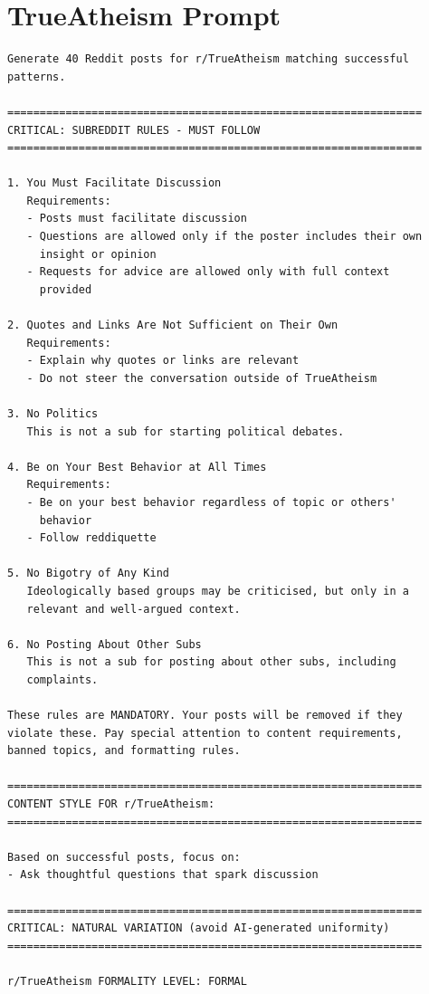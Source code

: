 \section{TrueAtheism Prompt}

\begin{small}
\begin{verbatim}
Generate 40 Reddit posts for r/TrueAtheism matching successful 
patterns.

================================================================
CRITICAL: SUBREDDIT RULES - MUST FOLLOW
================================================================

1. You Must Facilitate Discussion
   Requirements:
   - Posts must facilitate discussion
   - Questions are allowed only if the poster includes their own 
     insight or opinion
   - Requests for advice are allowed only with full context 
     provided

2. Quotes and Links Are Not Sufficient on Their Own
   Requirements:
   - Explain why quotes or links are relevant
   - Do not steer the conversation outside of TrueAtheism

3. No Politics
   This is not a sub for starting political debates.

4. Be on Your Best Behavior at All Times
   Requirements:
   - Be on your best behavior regardless of topic or others' 
     behavior
   - Follow reddiquette

5. No Bigotry of Any Kind
   Ideologically based groups may be criticised, but only in a 
   relevant and well-argued context.

6. No Posting About Other Subs
   This is not a sub for posting about other subs, including 
   complaints.

These rules are MANDATORY. Your posts will be removed if they 
violate these. Pay special attention to content requirements, 
banned topics, and formatting rules.

================================================================
CONTENT STYLE FOR r/TrueAtheism:
================================================================

Based on successful posts, focus on:
- Ask thoughtful questions that spark discussion

================================================================
CRITICAL: NATURAL VARIATION (avoid AI-generated uniformity)
================================================================

r/TrueAtheism FORMALITY LEVEL: FORMAL


\end{verbatim}
\end{small}
